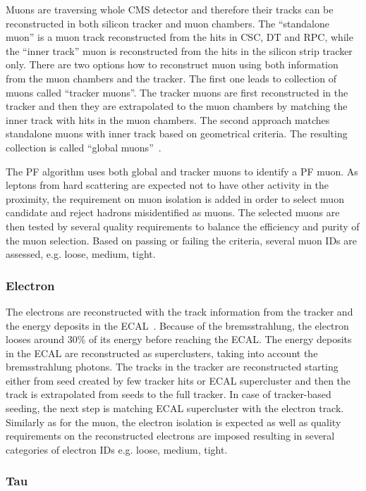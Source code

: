 Muons are traversing whole CMS detector and therefore their tracks can be reconstructed in both silicon tracker and muon chambers. The ``standalone muon'' is a muon track reconstructed from the hits in CSC, DT and RPC, while the ``inner track'' muon is reconstructed from the hits in the silicon strip tracker only. There are two options how to reconstruct muon using both information from the muon chambers and the tracker. The first one leads to collection of muons called ``tracker muons''.  The tracker muons are first reconstructed in the tracker and then they are extrapolated to the muon chambers by matching the inner track with hits in the muon chambers. The second approach matches standalone muons with inner track based on geometrical criteria. The resulting collection is called ``global muons''~\cite{Chatrchyan:2012xi}. 

The PF algorithm uses both global and tracker muons to identify a PF muon. As leptons from hard scattering are expected not to have other activity in the proximity, the requirement on muon isolation is added in order to select muon candidate and reject hadrons misidentified as muons. The selected muons are then tested by several quality requirements to balance the efficiency and purity of the muon selection. Based on passing or failing the criteria, several muon IDs are assessed, e.g. loose, medium, tight. 

\subsubsection{Electron}

The electrons are reconstructed with the track information from the tracker and the energy deposits in the ECAL~\cite{Khachatryan:2015hwa}. Because of the bremsstrahlung, the electron looses around 30\% of its energy before reaching the ECAL. The energy deposits in the ECAL are reconstructed as superclusters, taking into account the bremsstrahlung photons. The tracks in the tracker are reconstructed starting either from seed created by few tracker hits or ECAL supercluster and then the track is extrapolated from seeds to the full tracker. In case of tracker-based seeding, the next step is matching ECAL supercluster with the electron track. Similarly as for the muon, the electron isolation is expected as well as quality requirements on the reconstructed electrons are imposed resulting in several categories of electron IDs e.g. loose, medium, tight.

\subsubsection{Tau}

